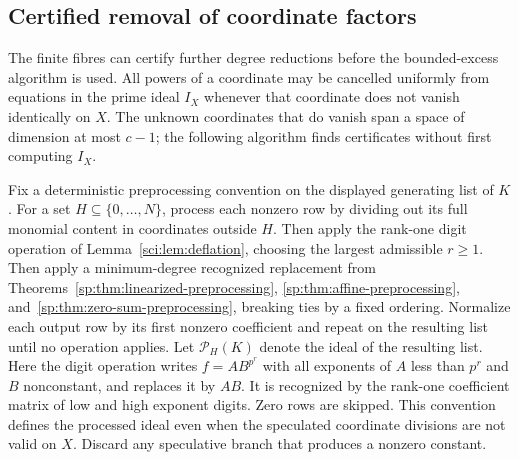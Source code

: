 \subsection{Certified removal of coordinate factors}
The finite fibres can certify further degree reductions before the
bounded-excess algorithm is used. All powers of a coordinate may be cancelled uniformly from equations
in the prime ideal $I_X$ whenever that coordinate does not vanish
identically on $X$. The unknown coordinates that do
vanish span a space of dimension at most $c-1$; the following algorithm
finds certificates without first computing $I_X$.

Fix a deterministic preprocessing convention on the displayed generating
list of $K$. For a set
$H\subseteq\{0,\ldots,N\}$, process each nonzero row by dividing out its
full monomial content in coordinates outside $H$. Then apply the
rank-one digit operation of Lemma~\ref{sci:lem:deflation}, choosing the
largest admissible $r\ge1$. Then apply a minimum-degree recognized
replacement from Theorems~\ref{sp:thm:linearized-preprocessing},
\ref{sp:thm:affine-preprocessing}, and~\ref{sp:thm:zero-sum-preprocessing}, breaking ties by a fixed
ordering. Normalize each output row by its first nonzero coefficient
and repeat on the resulting list until no operation applies. Let
$\mathcal P_H(K)$ denote the ideal of the resulting list. Here the digit
operation writes $f=AB^{p^r}$ with all exponents of $A$ less than $p^r$
and $B$ nonconstant, and replaces it by $AB$. It is recognized by the
rank-one coefficient matrix of low and high exponent digits. Zero rows
are skipped. This convention defines the processed ideal even when the
speculated coordinate divisions are not valid on $X$.
Discard any speculative branch that produces a nonzero constant.

